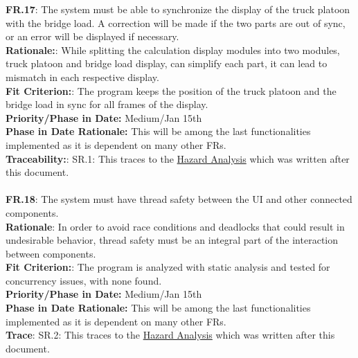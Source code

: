 \documentclass[12pt]{article}
\begin{document}
  \noindent\textbf{FR.17}: The system must be able to synchronize the display of the truck platoon with the bridge 
  load. A correction will be made if the two parts are out of sync, or an error will be displayed if necessary.\\
  \textbf{Rationale:}: While splitting the calculation display modules into two modules, truck platoon and bridge load 
  display, can simplify each part, it can lead to mismatch in each respective display.\\
  \textbf{Fit Criterion:}: The program keeps the position of the truck platoon and the bridge load in sync for all 
  frames of the display.\\
  \textbf{Priority/Phase in Date:} Medium/Jan 15th\\
  \textbf{Phase in Date Rationale:} This will be among the last functionalities implemented as it is dependent on many other FRs.\\
  \textbf{Traceability:}: SR.1: This traces to the \href{https://github.com/agentvv/MTOBridge/blob/main/docs%20Rev1/HazardAnalysis/HazardAnalysis.pdf}{Hazard Analysis} which was written after this document.\\\\

  \noindent\textbf{FR.18}: The system must have thread safety between the UI and other connected components.\\
  \textbf{Rationale}: In order to avoid race conditions and deadlocks that could result in undesirable behavior,
  thread safety must be an integral part of the interaction between components.\\
  \textbf{Fit Criterion:}: The program is analyzed with static analysis and tested for concurrency issues, with none 
  found.\\
  \textbf{Priority/Phase in Date:} Medium/Jan 15th\\
  \textbf{Phase in Date Rationale:} This will be among the last functionalities implemented as it is dependent on many other FRs.\\
  \textbf{Trace}: SR.2: This traces to the \href{https://github.com/agentvv/MTOBridge/blob/main/docs%20Rev1/HazardAnalysis/HazardAnalysis.pdf}{Hazard Analysis} which was written after this document.\\\\
\end{document}
